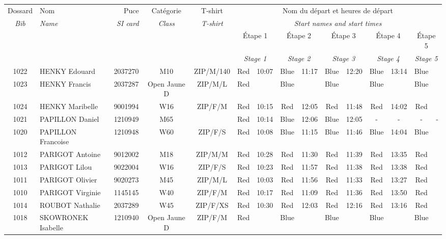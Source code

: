 \documentclass{report}
\begin{document}
  \begin{longtable}{|c|l|r|c|c|*{5}{cc|}}
    Dossard & Nom  & Puce    & Catégorie & T-shirt & \multicolumn{10}{c|}{Nom du départ et heures de départ} \\
    \itshape Bib     & \itshape Name & \itshape SI card & \itshape Class  & \itshape  T-shirt  & \multicolumn{10}{c|}{\itshape Start names and start times} \\
    \hline
    & & & & & \multicolumn{2}{c|}{Étape 1} & \multicolumn{2}{c|}{Étape 2} & \multicolumn{2}{c|}{Étape 3} & \multicolumn{2}{c|}{Étape 4} & \multicolumn{2}{c|}{Étape 5} \\
    & & & & & \multicolumn{2}{c|}{\itshape Stage 1} & \multicolumn{2}{c|}{\itshape Stage 2} & \multicolumn{2}{c|}{\itshape Stage 3} & \multicolumn{2}{c|}{\itshape Stage 4} & \multicolumn{2}{c|}{\itshape Stage 5} \\
    \hline
    1022 & HENKY Edouard & 2037270 & M10 & ZIP/M/140 & Red & 10:07 & Blue & 11:17 & Blue & 12:20 & Blue & 13:14 & Blue &  \\
    1023 & HENKY Francis & 2037287 & Open Jaune D & ZIP/M/L & Red &   & Blue &   & Blue &   & Blue &   & Blue &  \\
    1024 & HENKY Maribelle & 9001994 & W16 & ZIP/F/M & Red & 10:15 & Red & 12:05 & Red & 11:48 & Red & 14:02 & Red &  \\
    1021 & PAPILLON Daniel & 1210949 & M65 &   & Red & 10:14 & Blue & 12:06 & Blue & 12:05 & - &  - & - &  -\\
    1020 & PAPILLON Francoise & 1210948 & W60 & ZIP/F/S & Red & 10:08 & Blue & 11:15 & Blue & 11:46 & Blue & 14:04 & Blue &  \\
    1012 & PARIGOT Antoine & 9012002 & M18 & ZIP/M/M & Red & 10:28 & Red & 11:30 & Red & 11:39 & Red & 13:35 & Red &  \\
    1013 & PARIGOT Lilou & 9022004 & W16 & ZIP/F/S & Red & 10:23 & Red & 11:57 & Red & 11:38 & Red & 13:38 & Red &  \\
    1011 & PARIGOT Olivier & 9020273 & M45 & ZIP/M/L & Red & 10:03 & Red & 11:56 & Red & 11:33 & Red & 13:27 & Red &  \\
    1010 & PARIGOT Virginie & 1145145 & W40 & ZIP/F/M & Red & 10:17 & Red & 11:09 & Red & 11:36 & Red & 13:50 & Red &  \\
    1014 & ROUBOT Nathalie & 2037289 & W45 & ZIP/F/XS & Red & 10:30 & Red & 12:03 & Red & 12:16 & Red & 13:16 & Red &  \\
    1018 & SKOWRONEK Isabelle & 1210940 & Open Jaune D & ZIP/F/M & Red &   & Blue &   & Blue &   & Blue &   & Blue &  \\

\end{longtable}
\end{document}
